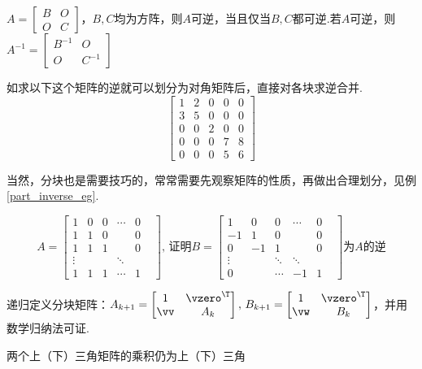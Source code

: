 \begin{corollary}
\label{part_inverse_col}
$A=\begin{bmatrix}B&O \\ O&C\end{bmatrix}$，$B,C$均为方阵，则$A$可逆，当且仅当$B,C$都可逆.若$A$可逆，则$A^{-1}=\begin{bmatrix}B^{-1}&O \\ O&C^{-1}\end{bmatrix}$
\end{corollary}
如求以下这个矩阵的逆就可以划分为对角矩阵后，直接对各块求逆合并.
\[\begin{bmatrix}
1&2&0&0&0\\
3&5&0&0&0\\
0&0&2&0&0\\
0&0&0&7&8\\
0&0&0&5&6
\end{bmatrix}\]
\par 当然，分块也是需要技巧的，常常需要先观察矩阵的性质，再做出合理划分，见例\ref{part_inverse_eg}.
\begin{example}%
\label{part_inverse_eg}
\[A=\begin{bmatrix}1&0&0&\cdots&0\\1&1&0& &0\\1&1&1& &0\\\vdots& & &\ddots& &\\1&1&1&\cdots&1\end{bmatrix},\,\text{证明}B=\begin{bmatrix}1&0&0&\cdots&0\\-1&1&0& &0\\0&-1&1& &0\\\vdots& &\ddots &\ddots& &\\0& &\cdots&-1&1\end{bmatrix}\text{为$A$的逆}\]
\end{example}
\begin{analysis}
递归定义分块矩阵：$A_{k+1}=\begin{bmatrix}1&\vzero^\T\\\vv&A_k\end{bmatrix},\,B_{k+1}=\begin{bmatrix}1&\vzero^\T\\\vw&B_k\end{bmatrix}$，并用数学归纳法可证.
\end{analysis}
\begin{theorem}
两个上（下）三角矩阵的乘积仍为上（下）三角
\end{theorem}
